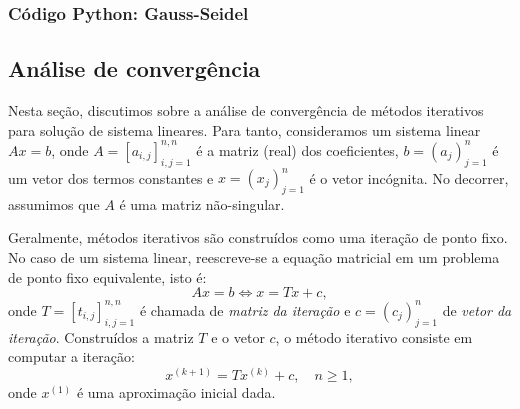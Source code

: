 \subsubsection{Código Python: Gauss-Seidel}


\fi

\subsection{Análise de convergência}

Nesta seção, discutimos sobre a análise de convergência de métodos iterativos para solução de sistema lineares. Para tanto, consideramos um sistema linear $Ax = b$, onde $A = [a_{i,j}]_{i,j=1}^{n,n}$ é a matriz (real) dos coeficientes, $b = (a_j)_{j=1}^n$ é um vetor dos termos constantes e $x = (x_j)_{j=1}^n$ é o vetor incógnita. No decorrer, assumimos que $A$ é uma matriz não-singular.

Geralmente, métodos iterativos são construídos como uma iteração de ponto fixo. No caso de um sistema linear, reescreve-se a equação matricial em um problema de ponto fixo equivalente, isto é:
\begin{equation*}
  Ax = b \Leftrightarrow x = Tx + c,
\end{equation*}
onde $T = [t_{i,j}]_{i,j=1}^{n,n}$ é chamada de \emph{matriz da iteração} e $c = (c_j)_{j=1}^n$ de \emph{vetor da iteração}. Construídos a matriz $T$ e o vetor $c$, o método iterativo consiste em computar a iteração:
\begin{equation*}
  x^{(k+1)} = Tx^{(k)} + c,\quad n\geq 1, 
\end{equation*}
onde $x^{(1)}$ é uma aproximação inicial dada.

